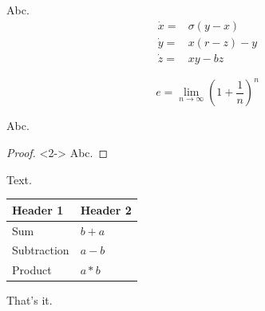 \documentclass{beamer}
\newcommand{\autotitle}{\secname\ifdefempty{\subsecname}{}{~--- \subsecname}}
\begin{document}
\begin{frame}{\autotitle}
    \begin{theorem}
        Abc.
        \begin{align*}
            \dot x = & \sigma (y-x)\\
            \dot y = & x (r - z) - y\\
            \dot z = & xy - bz
        \end{align*}
    \end{theorem}
    
    \begin{equation*}
        e=\lim_{n\to\infty}\left(1+\frac{1}{n}\right)^n
    \end{equation*}
\end{frame}

\begin{frame}{\autotitle}
    \begin{lemma}
        Abc.
    \end{lemma}

    \begin{proof}<2->
        Abc.
    \end{proof}

    Text.
\end{frame}

\begin{frame}{\autotitle}
    \centering
    \begin{tabular}{|l|l|}
        \hline
        \textbf{Header 1} & \textbf{Header 2}\\
        \hline
        Sum & $b+a$\\
        \hline
        Subtraction & $a-b$\\
        \hline
        Product & $a*b$\\
        \hline
    \end{tabular}

    \pause
    
    That's it.
\end{frame}
\end{document}
